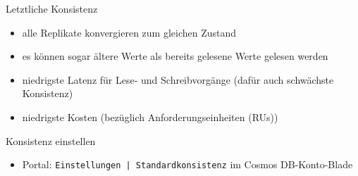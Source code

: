 \begin{flashcard}[Definition]{Letztliche Konsistenz}
    \begin{itemize}
        \item alle Replikate konvergieren zum gleichen Zustand
        \item es können sogar ältere Werte als bereits gelesene Werte gelesen werden
        \item niedrigste Latenz für Lese- und Schreibvorgänge (dafür auch schwächste Konsistenz)
        \item niedrigste Kosten (bezüglich Anforderungseinheiten (RUs))
    \end{itemize}
\end{flashcard}

\begin{flashcard}[Definition]{Konsistenz einstellen}
    \begin{itemize}
        \item Portal: \texttt{Einstellungen | Standardkonsistenz} im Cosmos DB-Konto-Blade
    \end{itemize}
\end{flashcard}
